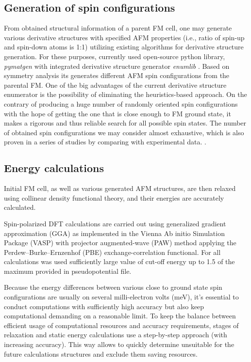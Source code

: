\subsection{Generation of spin configurations}
From obtained structural information of a parent FM cell, one may generate various derivative structures with specified AFM properties (i.e., ratio of spin-up and spin-down atoms is 1:1) utilizing existing algorithms for derivative structure generation. 
For these purposes, currently used open-source python library, \textit{pymatgen} \cite{Ong:2013vd} with integrated derivative structure generator \textit{enumlib} \cite{enum_1, enum_2, enum_3, enum_4}. Based on symmetry analysis its generates different AFM spin configurations from the parental FM. One of the big advantages of the current derivative structure enumerator is the possibility of eliminating the heuristics-based approach. On the contrary of producing a huge number of randomly oriented spin configurations with the hope of getting the one that is close enough to FM ground state, it makes a rigorous and thus reliable search for all possible spin states. The number of obtained spin configurations we may consider almost exhaustive, which is also proven in a series of studies by comparing with experimental data. \cite{Zhu_2018, Jiang_2018} .

\subsection{Energy calculations}

Initial FM cell, as well as various generated AFM structures, are then relaxed using collinear density functional theory,  and their energies are accurately calculated.  

Spin-polarized DFT calculations are carried out using generalized gradient approximation (GGA) as implemented in the Vienna Ab initio Simulation Package (VASP) \cite{Kresse_1996} with projector augmented-wave (PAW) \cite{Kresse_1999} method applying the Perdew–Burke–Ernzenhof (PBE) \cite{Perdew_1996} exchange-correlation functional. For all calculations was used sufficiently large value of cut-off energy up to 1.5 of the maximum provided in pseudopotential file.

Because the energy differences between various close to ground state spin configurations are usually on several milli-electron volts (meV), it's essential to conduct computations with sufficiently high accuracy but also keep computational demanding on a reasonable limit. To keep the balance between efficient usage of computational resources and accuracy requirements, stages of relaxation and static energy calculations use a step-by-step approach (with increasing accuracy). This way allows to quickly determine unsuitable for the future calculations structures and exclude them saving resources.

